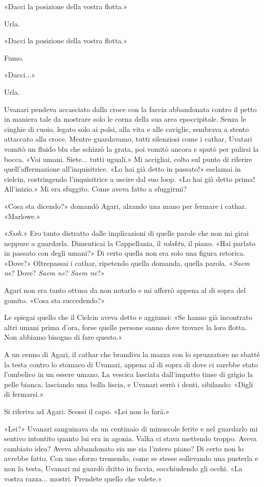 «Dacci la posizione della vostra flotta.»

Urla.

«Dacci la posizione della vostra flotta.»

Fumo.

«Dacci...»

Urla.

Uvanari pendeva accasciato dalla croce con la faccia abbandonata contro
il petto in maniera tale da mostrare solo le corna della sua area
epoccipitale. Senza le cinghie di cuoio, legato solo ai polsi, alla vita
e alle caviglie, sembrava a stento attaccato alla croce. Mentre
guardavamo, tutti silenziosi come i cathar, Uvatari vomitò un fluido blu
che schizzò la grata, poi vomitò ancora e sputò per pulirsi la bocca.
«Voi umani. Siete... tutti uguali.» Mi accigliai, colto sul punto di
riferire quell'affermazione all'inquisitrice. «Lo hai già detto in
passato!» esclamai in cielcin, costringendo l'inquisitrice a uscire dal
suo loop. «Lo hai già detto prima! All'inizio.» Mi era sfuggito. Come
aveva fatto a sfuggirmi?

«Cosa sta dicendo?» domandò Agari, alzando una mano per fermare i
cathar. «Marlowe.»

«\emph{Sssh}.» Ero tanto distratto dalle implicazioni di quelle parole
che non mi girai neppure a guardarla. Dimenticai la Cappellania, il
\emph{ndaktu}, il piano. «Hai parlato in passato con degli umani?» Di
certo quella non era solo una figura retorica. «Dove?» Oltrepassai i
cathar, ripetendo quella domanda, quella parola. «\emph{Saem ne}?
\emph{} Dove? \emph{Saem ne}? \emph{Saem ne}?»

Agari non era tanto ottusa da non notarlo e mi afferrò appena al di
sopra del gomito. «Cosa sta succedendo?»

Le spiegai quello che il Cielcin aveva detto e aggiunsi: «Se hanno già
incontrato altri umani prima d'ora, forse quelle persone sanno dove
trovare la loro flotta. Non abbiamo bisogno di fare questo.»

A un cenno di Agari, il cathar che brandiva la mazza con lo spruzzatore
ne sbatté la testa contro lo stomaco di Uvanari, appena al di sopra di
dove ci sarebbe stato l'ombelico in un essere umano. La vescica lasciata
dall'impatto tinse di grigio la pelle bianca, lasciando una bolla
liscia, e Uvanari serrò i denti, sibilando: «Digli di fermarsi.»

Si riferiva ad Agari. Scossi il capo. «Lei non lo farà.»

«Lei?» Uvanari sanguinava da un centinaio di minuscole ferite e nel
guardarlo mi sentivo intontito quanto lui era in agonia. Valka ci stava
mettendo troppo. Aveva cambiato idea? Aveva abbandonato sia me sia
l'intero piano? Di certo non lo avrebbe fatto. Con uno sforzo tremendo,
come se stesse sollevando una pusterla e non la testa, Uvanari mi guardò
dritto in faccia, socchiudendo gli occhi. «La vostra razza... mostri.
Prendete quello che volete.»


